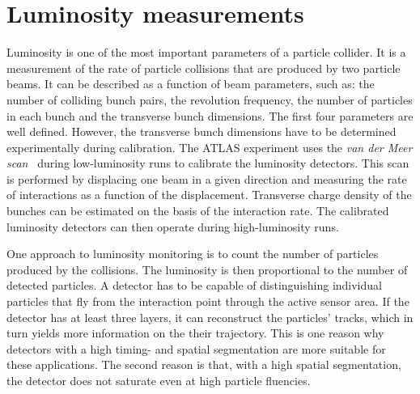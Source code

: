 \section{Luminosity measurements}
\label{sec:lummeas}
 \label{sec:lumi}
Luminosity is one of the most important parameters of a particle collider. It is a measurement of the rate of particle collisions that are produced by two particle beams. It can be described as a function of beam parameters, such as: the number of colliding bunch pairs, the revolution frequency, the number of particles in each bunch and the transverse bunch dimensions. The first four parameters are well defined. However, the transverse bunch dimensions have to be determined experimentally during calibration. The ATLAS experiment uses the \emph{van der Meer scan}~\cite{} during low-luminosity runs to calibrate the luminosity detectors. This scan is performed by displacing one beam in a given direction and measuring the rate of interactions as a function of the displacement. Transverse charge density of the bunches can be estimated on the basis of the interaction rate. The calibrated luminosity detectors can then operate during high-luminosity runs.

One approach to luminosity monitoring is to count the number of particles produced by the collisions. The luminosity is then proportional to the number of detected particles. A detector has to be capable of distinguishing individual particles that fly from the interaction point through the active sensor area. If the detector has at least three layers, it can reconstruct the particles' tracks, which in turn yields more information on the their trajectory. This is one reason why detectors with a high timing- and spatial segmentation are more suitable for these applications. The second reason is that, with a high spatial segmentation, the detector does not saturate even at high particle fluencies.





